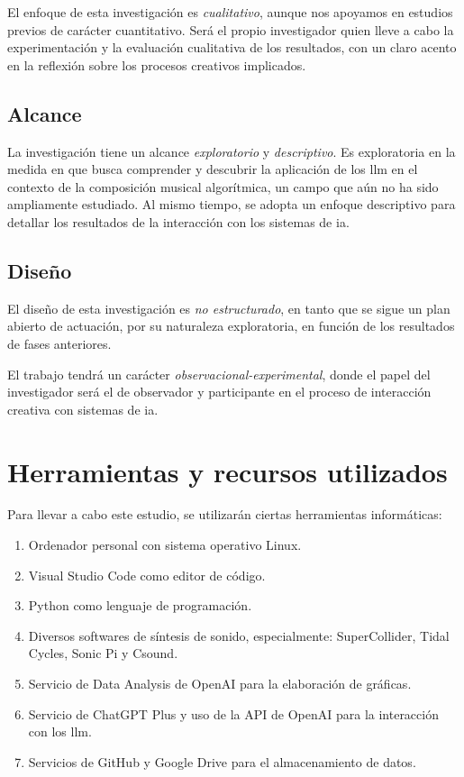 El enfoque de esta investigación es \emph{cualitativo}, aunque nos apoyamos en estudios previos de carácter cuantitativo. Será el propio investigador quien lleve a cabo la experimentación y la evaluación cualitativa de los resultados, con un claro acento en la reflexión sobre los procesos creativos implicados.

\subsection{Alcance}
La investigación tiene un alcance \emph{exploratorio} y \emph{descriptivo}. Es exploratoria en la medida en que busca comprender y descubrir la aplicación de los \gls{llm} en el contexto de la composición musical algorítmica, un campo que aún no ha sido ampliamente estudiado. Al mismo tiempo, se adopta un enfoque descriptivo para detallar los resultados de la interacción con los sistemas de \gls{ia}.


\subsection{Diseño}
El diseño de esta investigación es \emph{no estructurado}, en tanto que se sigue un plan abierto de actuación, por su naturaleza exploratoria, en función de los resultados de fases anteriores.

El trabajo tendrá un carácter \emph{observacional-experimental}, donde el papel del investigador será el de observador y participante en el proceso de interacción creativa con sistemas de \gls{ia}.

\section{Herramientas y recursos utilizados}

Para llevar a cabo este estudio, se utilizarán ciertas herramientas informáticas:

\begin{enumerate}
    \item Ordenador personal con sistema operativo Linux.
    \item Visual Studio Code como editor de código.
    \item Python como lenguaje de programación.
    \item Diversos softwares de síntesis de sonido, especialmente: SuperCollider, Tidal Cycles, Sonic Pi y Csound.
    \item Servicio de Data Analysis de OpenAI para la elaboración de gráficas.
    \item Servicio de ChatGPT Plus y uso de la API de OpenAI para la interacción con los \gls{llm}.
    \item Servicios de GitHub y Google Drive para el almacenamiento de datos.
\end{enumerate}


